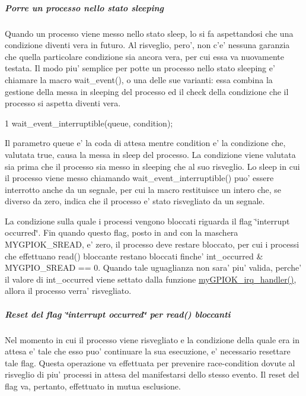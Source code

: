 \subparagraph*{Porre un processo nello stato sleeping}

Quando un processo viene messo nello stato sleep, lo si fa aspettandosi che una condizione diventi vera in futuro. Al risveglio, pero', non c'e' nessuna garanzia che quella particolare condizione sia ancora vera, per cui essa va nuovamente testata. Il modo piu' semplice per potte un processo nello stato sleeping e' chiamare la macro wait\+\_\+event(), o una delle sue varianti\+: essa combina la gestione della messa in sleeping del processo ed il check della condizione che il processo si aspetta diventi vera. 
\begin{DoxyCode}
1 wait\_event\_interruptible(queue, condition);
\end{DoxyCode}
 Il parametro queue e' la coda di attesa mentre condition e' la condizione che, valutata true, causa la messa in sleep del processo. La condizione viene valutata sia prima che il processo sia messo in sleeping che al suo risveglio. Lo sleep in cui il processo viene messo chiamando wait\+\_\+event\+\_\+interruptible() puo' essere interrotto anche da un segnale, per cui la macro restituisce un intero che, se diverso da zero, indica che il processo e' stato risvegliato da un segnale.

La condizione sulla quale i processi vengono bloccati riguarda il flag \char`\"{}interrupt occurred\char`\"{}. Fin quando questo flag, posto in and con la maschera M\+Y\+G\+P\+I\+O\+K\+\_\+\+S\+R\+E\+A\+D, e' zero, il processo deve restare bloccato, per cui i processi che effettuano read() bloccante restano bloccati finche' int\+\_\+occurred \& M\+Y\+G\+P\+I\+O\+\_\+\+S\+R\+E\+A\+D == 0. Quando tale uguaglianza non sara' piu' valida, perche' il valore di int\+\_\+occurred viene settato dalla funzione \hyperlink{group___kernel-_module_ga2fc230a12a97aa63e43b2dc4aec73511}{my\+G\+P\+I\+O\+K\+\_\+irq\+\_\+handler()}, allora il processo verra' risvegliato.

\subparagraph*{Reset del flag \char`\"{}interrupt occurred\char`\"{} per read() bloccanti}

Nel momento in cui il processo viene risvegliato e la condizione della quale era in attesa e' tale che esso puo' continuare la sua esecuzione, e' necessario resettare tale flag. Questa operazione va effettuata per prevenire race-\/condition dovute al risveglio di piu' processi in attesa del manifestarsi dello stesso evento. Il reset del flag va, pertanto, effettuato in mutua esclusione.

